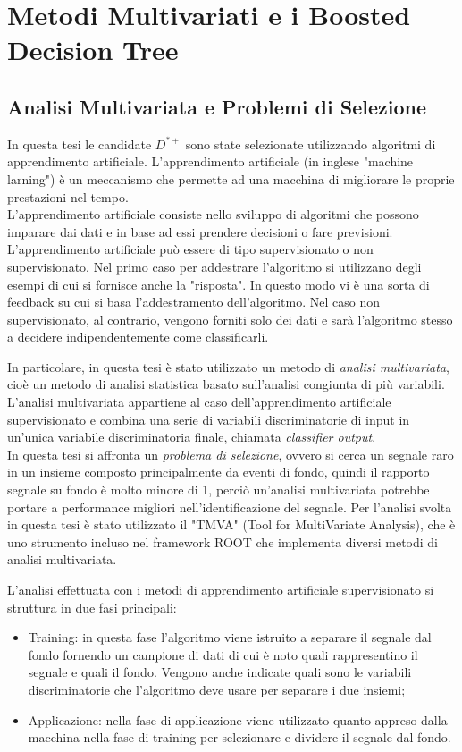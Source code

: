 \chapter{Metodi Multivariati e i Boosted Decision Tree}

\section{Analisi Multivariata e Problemi di Selezione} \label{AnalisiMulti}
In questa tesi le candidate $D^{*+}$ sono state selezionate utilizzando algoritmi di apprendimento artificiale. L'apprendimento artificiale (in inglese "machine larning") \`e un meccanismo che permette ad una macchina di migliorare le proprie prestazioni nel tempo. \cite{sitoMachineLearning}
\\L'apprendimento artificiale consiste nello sviluppo di algoritmi che possono imparare dai dati e in base ad essi prendere decisioni o fare previsioni. L'apprendimento artificiale può essere di tipo supervisionato o non supervisionato. Nel primo caso per addestrare l'algoritmo si utilizzano degli esempi di cui si fornisce anche la "risposta". In questo modo vi è una sorta di feedback su cui si basa l'addestramento dell'algoritmo. Nel caso non supervisionato, al contrario, vengono forniti solo dei dati e sarà l'algoritmo stesso a decidere indipendentemente come classificarli. 

In particolare, in questa tesi \`e stato utilizzato un metodo di \textit{analisi multivariata}, cioè un metodo di analisi statistica basato sull'analisi congiunta di più variabili. L'analisi multivariata appartiene al caso dell'apprendimento artificiale supervisionato e combina una serie di variabili discriminatorie di input in un'unica variabile discriminatoria finale, chiamata \textit{classifier output}.
\\In questa tesi si affronta un \textit{problema di selezione}, ovvero si cerca un segnale raro in un insieme composto principalmente da eventi di fondo, quindi il rapporto segnale su fondo \`e molto minore di 1, perciò un'analisi multivariata potrebbe portare a performance migliori nell'identificazione del segnale.
Per l'analisi svolta in questa tesi \`e stato utilizzato il "TMVA" \cite{TMVA} (Tool for MultiVariate Analysis), che \`e uno strumento incluso nel framework ROOT\cite{Root} che implementa diversi metodi di analisi multivariata.

L'analisi effettuata con i metodi di apprendimento artificiale supervisionato si struttura in due fasi principali:
    \begin{itemize}
        \item Training: in questa fase l'algoritmo viene istruito a separare il segnale dal fondo fornendo un campione di dati di cui è noto quali rappresentino il segnale e quali il fondo. Vengono anche indicate quali sono le variabili discriminatorie che l'algoritmo deve usare per separare i due insiemi;
        \item Applicazione: nella fase di applicazione viene utilizzato quanto appreso dalla macchina nella fase di training per selezionare e dividere il segnale dal fondo.
    \end{itemize}
    
